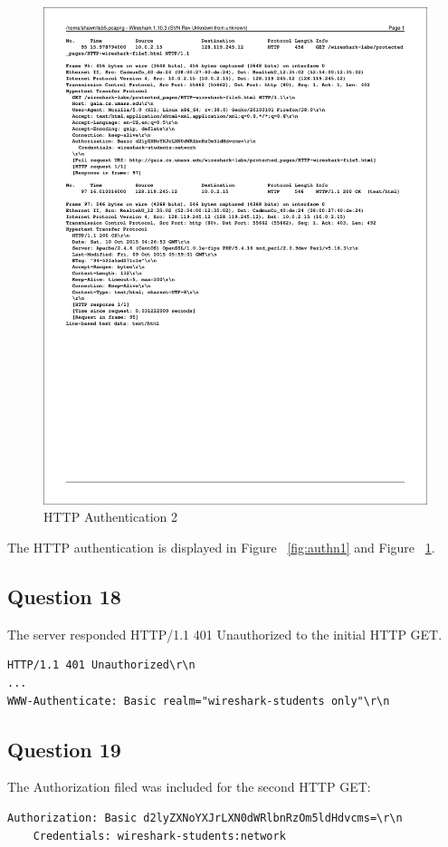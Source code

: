 \documentclass[titlepage, paper=a4, fontsize=11pt]{scrartcl} %
\numberwithin{equation}{section} %
\numberwithin{figure}{section} %
\numberwithin{table}{section} %
\begin{document}
\begin{figure}[!ht]
    \includegraphics[width=\textwidth]{images/authn2.pdf}
    \caption{HTTP Authentication 2}
    \label{fig:authn2}
\end{figure}

\newpage
The HTTP authentication is displayed in Figure ~\ref{fig:authn1} and Figure ~\ref{fig:authn2}.
\\

\subsection*{Question 18}
The server responded HTTP/1.1 401 Unauthorized to the initial HTTP GET.
\begin{verbatim}
HTTP/1.1 401 Unauthorized\r\n
...
WWW-Authenticate: Basic realm="wireshark-students only"\r\n
\end{verbatim}


\subsection*{Question 19}
The Authorization filed was included for the second HTTP GET:
\begin{verbatim}
Authorization: Basic d2lyZXNoYXJrLXN0dWRlbnRzOm5ldHdvcms=\r\n
    Credentials: wireshark-students:network
\end{verbatim}
\end{document}
